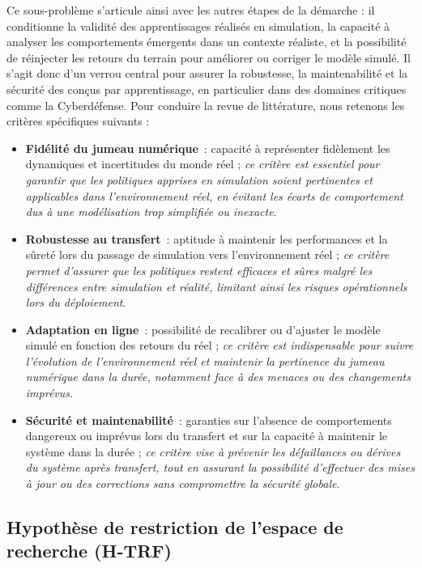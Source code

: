 Ce sous-problème s'articule ainsi avec les autres étapes de la démarche : il conditionne la validité des apprentissages réalisés en simulation, la capacité à analyser les comportements émergents dans un contexte réaliste, et la possibilité de réinjecter les retours du terrain pour améliorer ou corriger le modèle simulé. Il s'agit donc d'un verrou central pour assurer la robustesse, la maintenabilité et la sécurité des  conçus par apprentissage, en particulier dans des domaines critiques comme la Cyberdéfense.
Pour conduire la revue de littérature, nous retenons les critères spécifiques suivants :
%
\begin{itemize}
  \item \textbf{Fidélité du jumeau numérique}~: capacité à représenter fidèlement les dynamiques et incertitudes du monde réel ; \emph{ce critère est essentiel pour garantir que les politiques apprises en simulation soient pertinentes et applicables dans l'environnement réel, en évitant les écarts de comportement dus à une modélisation trop simplifiée ou inexacte}.
  \item \textbf{Robustesse au transfert}~: aptitude à maintenir les performances et la sûreté lors du passage de simulation vers l'environnement réel ; \emph{ce critère permet d'assurer que les politiques restent efficaces et sûres malgré les différences entre simulation et réalité, limitant ainsi les risques opérationnels lors du déploiement}.
  \item \textbf{Adaptation en ligne}~: possibilité de recalibrer ou d'ajuster le modèle simulé en fonction des retours du réel ; \emph{ce critère est indispensable pour suivre l'évolution de l'environnement réel et maintenir la pertinence du jumeau numérique dans la durée, notamment face à des menaces ou des changements imprévus}.
  \item \textbf{Sécurité et maintenabilité}~: garanties sur l'absence de comportements dangereux ou imprévus lors du transfert et sur la capacité à maintenir le système dans la durée ; \emph{ce critère vise à prévenir les défaillances ou dérives du système après transfert, tout en assurant la possibilité d'effectuer des mises à jour ou des corrections sans compromettre la sécurité globale}.
\end{itemize}


\subsection*{Hypothèse de restriction de l'espace de recherche (\textbf{H-TRF})}

